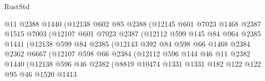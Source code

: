 \begin{lexlean}{RustStd}
\begin{coremodule}
                        @11
                        @2388
                        @1440
                        (@12138
                          @602
                          @85
                          @2388
                          (@12145
                            @601
                            @7023
                            @1468
                            @2387
                            @1515
                            @7003
                            (@12107
                              @601
                              @7023
                              @2387
                              (@12112
                                @599
                                @145
                                @84
                                @964
                                @2385
                                @1441
                                (@12138
                                  @599
                                  @84
                                  @2385
                                  (@12143
                                    @392
                                    @84
                                    @598
                                    @66
                                    @1468
                                    @2384
                                    @2362
                                    @6667
                                    (@12107
                                      @598
                                      @66
                                      @2384
                                      (@12112
                                        @596
                                        @144
                                        @46
                                        @11
                                        @2382
                                        @1440
                                        (@12138
                                          @596
                                          @46
                                          @2382
                                          (@8819
                                            @10474
                                            @1331
                                            @1331
                                            @182
                                            @122
                                            @122
                                            @95
                                            @46
                                            @1520
                                            @1413

\end{coremodule}
\end{lexlean}
